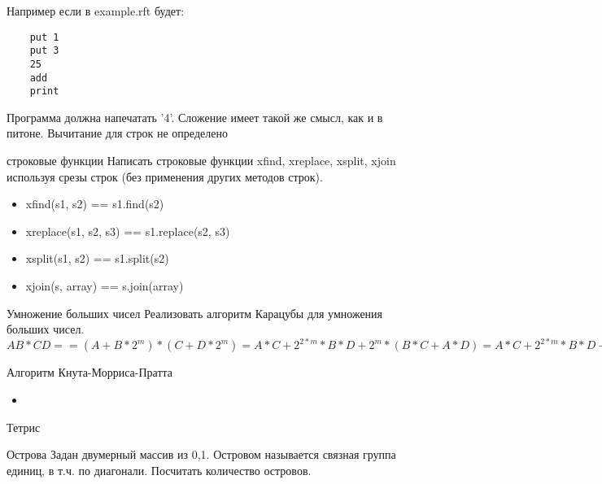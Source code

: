 \documentclass{article}
\begin{document}
Например если в example.rft будет:

\begin{verbatim}
    put 1
    put 3
    25
    add
    print
\end{verbatim}

Программа должна напечатать '4'. Сложение имеет такой же
смысл, как и в питоне. Вычитание для строк не определено

\newpage

{\center строковые функции}
Написать строковые функции xfind, xreplace, xsplit, xjoin используя
срезы строк (без применения других методов строк).
\begin{itemize}
    \item xfind(s1, s2) == s1.find(s2)
    \item xreplace(s1, s2, s3) == s1.replace(s2, s3)
    \item xsplit(s1, s2) == s1.split(s2)
    \item xjoin(s, array) == s.join(array)
\end{itemize}
\newpage

{\center Умножение больших чисел}
Реализовать алгоритм Карацубы для умножения больших чисел.
$AB * CD == (A + B * 2^m) * (C + D * 2^m) 
         = A * C + 2^{2*m} * B * D + 2^m * (B * C + A * D)
         = A * C + 2^{2*m} * B * D + 2^m * ((A + B)(C + D) – A * C - B * D) $
\newpage

{\center Алгоритм Кнута-Морриса-Пратта}
\begin{itemize}
    \item 
\end{itemize}
\newpage

{\center Тетрис}

\newpage

{\center Острова}
Задан двумерный массив из {0,1}. Островом называется связная группа единиц,
в т.ч. по диагонали. Посчитать количество островов.

\newpage

   
\end{document}
